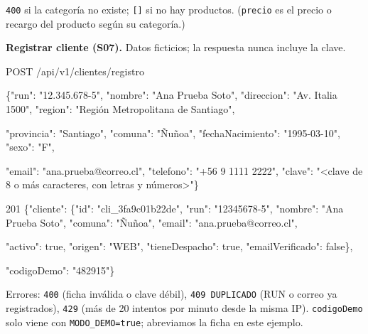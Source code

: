 \texttt{400} si la categoría no existe; \texttt{[\allowbreak{}]} si no hay productos. (\texttt{precio} es el precio o recargo del producto según su categoría.)


\textbf{Registrar cliente (S07).} Datos ficticios; la respuesta nunca incluye la clave.


\begin{codigo}
POST /\allowbreak{}api/\allowbreak{}v1/\allowbreak{}clientes/\allowbreak{}registro\par
\{"run":\allowbreak{} "12.\allowbreak{}345.\allowbreak{}678-\allowbreak{}5",\allowbreak{} "nombre":\allowbreak{} "Ana Prueba Soto",\allowbreak{} "direccion":\allowbreak{} "Av.\allowbreak{} Italia 1500",\allowbreak{} "region":\allowbreak{} "Región Metropolitana de Santiago",\allowbreak{}\par
\hspace*{1\ttw}"provincia":\allowbreak{} "Santiago",\allowbreak{} "comuna":\allowbreak{} "Ñuñoa",\allowbreak{} "fechaNacimiento":\allowbreak{} "1995-\allowbreak{}03-\allowbreak{}10",\allowbreak{} "sexo":\allowbreak{} "F",\allowbreak{}\par
\hspace*{1\ttw}"email":\allowbreak{} "ana.\allowbreak{}prueba@correo.\allowbreak{}cl",\allowbreak{} "telefono":\allowbreak{} "+56 9 1111 2222",\allowbreak{} "clave":\allowbreak{} "<clave de 8 o más caracteres,\allowbreak{} con letras y números>"\}\par
\end{codigo}

\begin{codigo}
201 \{"cliente":\allowbreak{} \{"id":\allowbreak{} "cli\_\allowbreak{}3fa9c01b22de",\allowbreak{} "run":\allowbreak{} "12345678-\allowbreak{}5",\allowbreak{} "nombre":\allowbreak{} "Ana Prueba Soto",\allowbreak{} "comuna":\allowbreak{} "Ñuñoa",\allowbreak{} "email":\allowbreak{} "ana.\allowbreak{}prueba@correo.\allowbreak{}cl",\allowbreak{}\par
\hspace*{17\ttw}"activo":\allowbreak{} true,\allowbreak{} "origen":\allowbreak{} "WEB",\allowbreak{} "tieneDespacho":\allowbreak{} true,\allowbreak{} "emailVerificado":\allowbreak{} false\},\allowbreak{}\par
\hspace*{5\ttw}"codigoDemo":\allowbreak{} "482915"\}\par
\end{codigo}

Errores: \texttt{400} (ficha inválida o clave débil), \texttt{409 DUPLICADO} (RUN o correo ya registrados), \texttt{429} (más de 20 intentos por minuto desde la misma IP). \texttt{codigoDemo} solo viene con \texttt{MODO\_\allowbreak{}DEMO=\allowbreak{}true}; abreviamos la ficha en este ejemplo.


